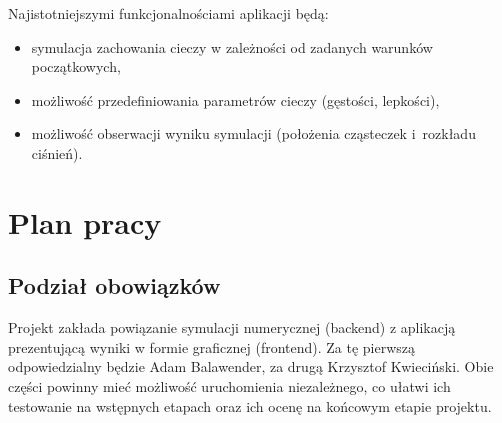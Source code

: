 \documentclass[a4paper]{article}
\begin{document}
Najistotniejszymi funkcjonalnościami aplikacji będą:
\begin{itemize}
    \item symulacja zachowania cieczy w zależności od zadanych warunków początkowych,
    \item możliwość przedefiniowania parametrów cieczy (gęstości, lepkości),
    \item możliwość obserwacji wyniku symulacji (położenia cząsteczek i~rozkładu ciśnień).
\end{itemize}

\section{Plan pracy}
\subsection{Podział obowiązków}
Projekt zakłada powiązanie symulacji numerycznej (backend) z aplikacją prezentującą wyniki w formie graficznej (frontend). Za tę pierwszą odpowiedzialny będzie Adam
Balawender, za drugą Krzysztof Kwieciński. Obie części powinny mieć możliwość uruchomienia niezależnego, co ułatwi ich testowanie na wstępnych etapach oraz ich ocenę na końcowym etapie projektu.
\end{document}

